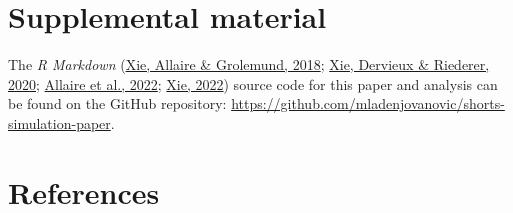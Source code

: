 \documentclass[fleqn,10pt,lineno]{wlpeerj} %
\begin{document}
\hypertarget{supplemental-material}{%
\section{Supplemental material}\label{supplemental-material}}

The \emph{R Markdown} (\protect\hyperlink{ref-rmarkdown2018}{Xie, Allaire \& Grolemund, 2018}; \protect\hyperlink{ref-rmarkdown2020}{Xie, Dervieux \& Riederer, 2020}; \protect\hyperlink{ref-R-rmarkdown}{Allaire et al., 2022}; \protect\hyperlink{ref-R-bookdown}{Xie, 2022}) source code for this paper and analysis can be found on the GitHub repository: \url{https://github.com/mladenjovanovic/shorts-simulation-paper}.

\hypertarget{references}{%
\section*{References}\label{references}}
\end{document}
